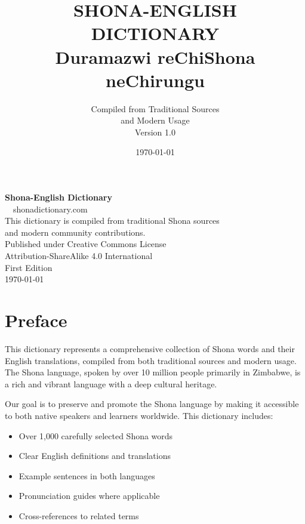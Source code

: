 \documentclass[10pt,twoside]{book}
\title{%
    {\Huge\textbf{SHONA-ENGLISH}}\\[0.5cm]
    {\Large\textbf{DICTIONARY}}\\[1cm]
    {\large Duramazwi reChiShona neChirungu}
}
\author{%
    Compiled from Traditional Sources\\
    and Modern Usage\\[0.5cm]
    {\small Version 1.0}
}
\date{\today}
\begin{document}
\frontmatter
\maketitle

\newpage
\thispagestyle{empty}
\vspace*{\fill}
\begin{center}
\textbf{Shona-English Dictionary}\\[0.5cm]
\textcopyright\ \the\year\ shonadictionary.com\\[0.5cm]

This dictionary is compiled from traditional Shona sources\\
and modern community contributions.\\[1cm]

Published under Creative Commons License\\
Attribution-ShareAlike 4.0 International\\[0.5cm]

First Edition\\
\today
\end{center}
\vspace*{\fill}

\tableofcontents
\newpage

\chapter*{Preface}

This dictionary represents a comprehensive collection of Shona words and their English translations, compiled from both traditional sources and modern usage. The Shona language, spoken by over 10 million people primarily in Zimbabwe, is a rich and vibrant language with a deep cultural heritage.

Our goal is to preserve and promote the Shona language by making it accessible to both native speakers and learners worldwide. This dictionary includes:

\begin{itemize}
\item Over 1,000 carefully selected Shona words
\item Clear English definitions and translations
\item Example sentences in both languages
\item Pronunciation guides where applicable
\item Cross-references to related terms
\end{itemize}
\end{document}
